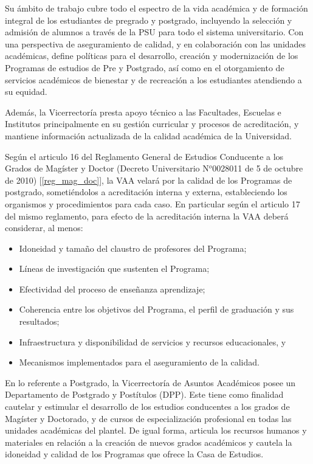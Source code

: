 Su ámbito de trabajo cubre todo el espectro de la vida académica y de formación integral de
los estudiantes de pregrado y postgrado, incluyendo la selección y admisión de alumnos a través
de la PSU para todo el sistema universitario. Con una perspectiva de aseguramiento de calidad,
y en colaboración con las unidades académicas, define políticas para el desarrollo, creación y
modernización de los Programas de estudios de Pre y Postgrado, así como en el otorgamiento
de servicios académicos de bienestar y de recreación a los estudiantes atendiendo a su equidad.

Además, la Vicerrectoría presta apoyo técnico a las Facultades, Escuelas e Institutos
principalmente en su gestión curricular y procesos de acreditación, y mantiene información
actualizada de la calidad académica de la Universidad.

Según el articulo 16 del Reglamento General de Estudios Conducente a los Grados de Magíster
y Doctor (Decreto Universitario N$^o$0028011 de 5 de octubre de 2010) [\ref{reg_mag_doc}], la VAA velará
por la calidad de los Programas de postgrado, sometiéndolos a acreditación interna y externa,
estableciendo los organismos y procedimientos para cada caso. En particular según el articulo 17
del mismo reglamento, para efecto de la acreditación interna la VAA deberá considerar, al menos:

\begin{itemize}
\item Idoneidad y tamaño del claustro de profesores del Programa;
\item Líneas de investigación que sustenten el Programa;
\item Efectividad del proceso de enseñanza aprendizaje;
\item Coherencia entre los objetivos del Programa, el perfil de graduación y sus resultados;
\item Infraestructura y disponibilidad de servicios y recursos educacionales, y
\item Mecanismos implementados para el aseguramiento de la calidad.
\end{itemize}

En lo referente a Postgrado, la Vicerrectoría de Asuntos Académicos posee un Departamento
de Postgrado y Postítulos (DPP). Este tiene como finalidad cautelar y estimular el desarrollo de
los estudios conducentes a los grados de Magíster y Doctorado, y de cursos de especialización
profesional en todas las unidades académicas del plantel. De igual forma, articula los recursos
humanos y materiales en relación a la creación de nuevos grados académicos y cautela la idoneidad
y calidad de los Programas que ofrece la Casa de Estudios.

